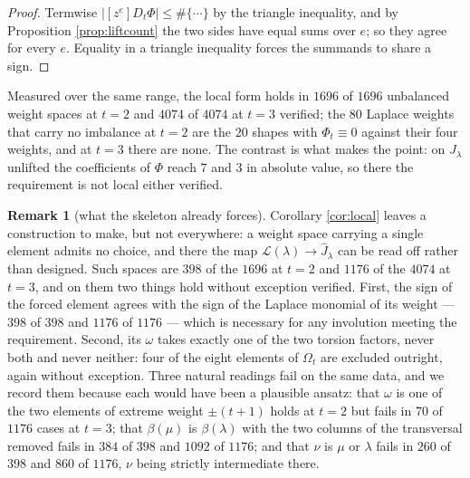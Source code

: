 \documentclass[11pt,reqno]{amsart}
\newcommand{\stverif}{\textcolor{hverif}{\small verified}}
\theoremstyle{plain}
\theoremstyle{definition}
\newtheorem{remark}[theorem]{Remark}
\begin{document}
\begin{proof}
Termwise $|[z^e]D_t\Phi|\le\#\{\cdots\}$ by the triangle inequality, and by Proposition \ref{prop:liftcount}
the two sides have equal sums over $e$; so they agree for every $e$. Equality in a triangle inequality forces the
summands to share a sign.
\end{proof}

Measured over the same range, the local form holds in $1696$ of $1696$ unbalanced weight spaces at
$t=2$ and $4074$ of $4074$ at $t=3$ \stverif; the $80$ Laplace weights that carry no imbalance at
$t=2$ are the $20$ shapes with $\Phi_t\equiv0$ against their four weights, and at $t=3$ there are
none. The contrast is what makes the point: on $J_\lambda$ unlifted the coefficients of $\Phi$ reach
$7$ and $3$ in absolute value, so there the requirement is not local either \stverif.

\begin{remark}[what the skeleton already forces]\label{rem:skeleton}
Corollary \ref{cor:local} leaves a construction to make, but not everywhere: a weight space carrying
a single element admits no choice, and there the map $\mathcal L(\lambda)\to\widehat J_\lambda$ can
be read off rather than designed. Such spaces are $398$ of the $1696$ at $t=2$ and $1176$ of the
$4074$ at $t=3$, and on them two things hold without exception \stverif. First, the sign of the
forced element agrees with the sign of the Laplace monomial of its weight --- $398$ of $398$ and
$1176$ of $1176$ --- which is necessary for any involution meeting the requirement. Second, its
$\omega$ takes exactly one of the two torsion factors, never both and never neither: four of the
eight elements of $\Omega_t$ are excluded outright, again without exception. Three natural readings
fail on the same data, and we record them because each would have been a plausible ansatz: that
$\omega$ is one of the two elements of extreme weight $\pm(t+1)$ holds at $t=2$ but fails in $70$ of
$1176$ cases at $t=3$; that $\beta(\mu)$ is $\beta(\lambda)$ with the two columns of the transversal
removed fails in $384$ of $398$ and $1092$ of $1176$; and that $\nu$ is $\mu$ or $\lambda$ fails in
$260$ of $398$ and $860$ of $1176$, $\nu$ being strictly intermediate there.
\end{remark}
\end{document}
